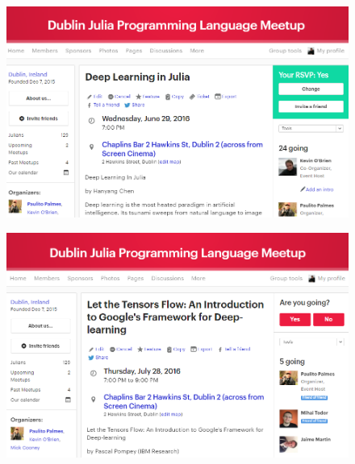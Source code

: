 \documentclass{beamer}
\begin{document}
\begin{frame}
	\begin{figure}
		\centering
		\includegraphics[width=1.1\linewidth]{Julia1}
	\end{figure}
	
\end{frame}

\begin{frame}
	\begin{figure}
		\centering
		\includegraphics[width=1.1\linewidth]{Julia2}

	\end{figure}
	
\end{frame}
\end{document}
